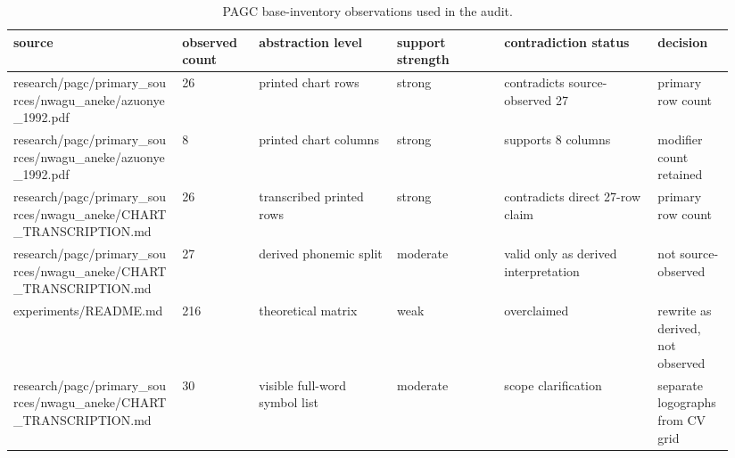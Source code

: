 \begin{table}[t]
\small
\caption{PAGC base-inventory observations used in the audit.}
\label{tab:inventory}
\begin{tabular}{p{0.22\linewidth}p{0.10\linewidth}p{0.18\linewidth}p{0.14\linewidth}p{0.20\linewidth}p{0.10\linewidth}}
\hline
source & observed count & abstraction level & support strength & contradiction status & decision \\
\hline
research/pagc/primary\_sources/nwagu\_aneke/azuonye\_1992.pdf & 26 & printed chart rows & strong & contradicts source-observed 27 & primary row count \\
research/pagc/primary\_sources/nwagu\_aneke/azuonye\_1992.pdf & 8 & printed chart columns & strong & supports 8 columns & modifier count retained \\
research/pagc/primary\_sources/nwagu\_aneke/CHART\_TRANSCRIPTION.md & 26 & transcribed printed rows & strong & contradicts direct 27-row claim & primary row count \\
research/pagc/primary\_sources/nwagu\_aneke/CHART\_TRANSCRIPTION.md & 27 & derived phonemic split & moderate & valid only as derived interpretation & not source-observed \\
experiments/README.md & 216 & theoretical matrix & weak & overclaimed & rewrite as derived, not observed \\
research/pagc/primary\_sources/nwagu\_aneke/CHART\_TRANSCRIPTION.md & 30 & visible full-word symbol list & moderate & scope clarification & separate logographs from CV grid \\
\hline
\end{tabular}
\end{table}
